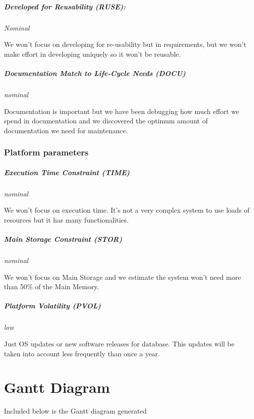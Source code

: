 \documentclass[11pt]{report}
\begin{document}
\paragraph{Developed for Reusability (RUSE):}  \textit{Nominal}

We won't focus on developing for re-usability but in requirements, but we won't make effort in developing uniquely so it won't be reusable.

\paragraph{Documentation Match to Life-Cycle Needs (DOCU)} \textit{nominal} 

Documentation is important but we have been debugging how much effort we spend in documentation and we discovered the optimum amount of documentation we need for maintenance.

\subsection{Platform parameters}
\paragraph{Execution Time Constraint  (TIME)} \textit{nominal} 

We won't focus on execution time. It's not a very complex system to use loads of resources but it has many functionalities.

\paragraph{Main Storage Constraint (STOR)} \textit{nominal}

We won't focus on Main Storage and we estimate the system won't need more than 50\% of the Main Memory.


\paragraph{Platform Volatility (PVOL) } \textit{low}

Just OS updates or new software releases for database. This updates will be taken into account less frequently than once a year.



\chapter{Gantt Diagram}
\label{chapGantt}
Included below is the Gantt diagram generated


\end{document}
